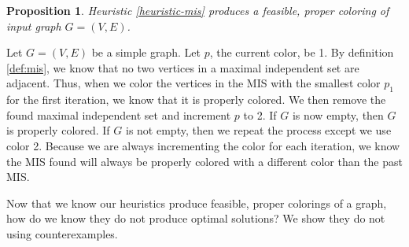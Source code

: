 \documentclass{article}
\newcounter{heuristic} \setcounter{heuristic}{0}
\newtheorem{prop}{Proposition}
\theoremstyle{definition}
\begin{document}
\begin{prop}
Heuristic \ref{heuristic-mis} produces a feasible, proper coloring of input graph \(G = (V, E)\).
\end{prop}

Let \(G = (V, E)\) be a simple graph. Let $p$, the current color, be 1. By definition \ref{def:mis}, we know that no two vertices in a maximal independent set are adjacent. Thus, when we color the vertices in the MIS with the smallest color \(p_1\) for the first iteration, we know that it is properly colored. We then remove the found maximal independent set and increment $p$ to 2. If $G$ is now empty, then $G$ is properly colored. If $G$ is not empty, then we repeat the process except we use color 2. Because we are always incrementing the color for each iteration, we know the MIS found will always be properly colored with a different color than the past MIS.

Now that we know our heuristics produce feasible, proper colorings of a graph, how do we know they do not produce optimal solutions? We show they do not using counterexamples. 


\newpage



\end{document}
